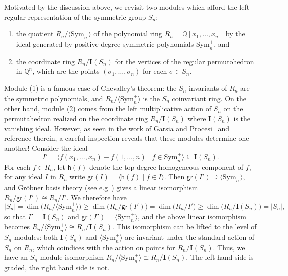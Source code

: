 \documentclass[12pt]{amsart}
\theoremstyle{definition}
\theoremstyle{remark}
\numberwithin{equation}{section}
\newcommand{\QQ}{\mathbb{Q}}
\newcommand{\Sym}{\mathrm{Sym}}
\begin{document}
Motivated by the discussion above, we revisit two modules which afford the left regular representation of the symmetric group $S_{n}$:
\begin{enumerate}[itemsep = 1ex]
\item the quotient $R_{n}\big/\langle \Sym_{n}^{+} \rangle$ of the polynomial ring $R_{n} = \QQ[x_{1}, \ldots, x_{n}]$ by the ideal generated by positive-degree symmetric polynomials $\Sym_{n}^{+}$, and

\item the coordinate ring $R_{n} / \mathbf{I}(S_{n})$ for the vertices of the regular permutohedron in $\QQ^{n}$, which are the points $(\sigma_{1}, \ldots, \sigma_{n})$ for each $\sigma \in S_{n}$.%

\end{enumerate}
Module (1) is a famous case of Chevalley's theorem: the $S_{n}$-invariants of $R_{n}$ are the symmetric polynomials, and $R_{n}\big/\langle \Sym_{n}^{+} \rangle$ is the $S_{n}$ coinvariant ring.  
On the other hand, module (2) comes from the left multiplicative action of $S_{n}$ on the permutahedron realized on the coordinate ring $R_{n} / \mathbf{I}(S_{n})$  where $\mathbf{I}(S_{n})$ is the vanishing ideal. 
However, as seen in the work of Garsia and Procesi~\cite{GP} and reference therein, a careful inspection reveals that these modules determine one another!  
Consider the ideal
\[
I' = \langle f(x_{1}, \ldots, x_{n}) - f(1, \ldots, n) \;|\; f \in \Sym_{n}^{+} \rangle \subseteq \mathbf{I}(S_{n}).
\]
For each $f \in R_{n}$, let $\mathsf{h}(f)$ denote the top-degree homogeneous component of $f$, for any ideal $I$ in $R_{n}$ write $\mathsf{gr}(I) = \langle \mathsf{h}(f) \;|\; f \in I \rangle$.  
Then $\mathsf{gr}(I') \supseteq \langle \Sym_{n}^{+} \rangle$, and Gr\"{o}bner basis theory (see e.g~\cite{CLO}) gives a linear isomorphism $R_{n}\big/\mathsf{gr}(I')  \cong R_{n}\big/I'$.  We therefore have
\[
|S_{n}| = \dim\big(R_{n}\big/\langle \Sym_{n}^{+} \rangle\big) \ge \dim\big(R_{n}\big/\mathsf{gr}(I')\big) = \dim\big(R_{n}\big/I') \ge \dim(R_{n}\big/\mathbf{I}(S_{n})\big) = |S_{n}|,
\]
so that $I' = \mathbf{I}(S_{n})$ and $\mathsf{gr}(I') = \langle \Sym_{n}^{+} \rangle$, and the above linear isomorphism becomes $R_{n}\big/\langle \Sym_{n}^{+} \rangle \cong R_{n}\big/\mathbf{I}(S_{n})$.  
This isomorphism can be lifted to the level of $S_{n}$-modules: both $\mathbf{I}(S_{n})$ and $\langle \Sym_{n}^{+} \rangle$ are invariant under the standard action of $S_{n}$ on $R_{n}$, which coindices with the action on points for $R_{n}\big/\mathbf{I}(S_{n})$.  
Thus, we have an $S_{n}$-module isomorphism $R_{n}\big/\langle \Sym_{n}^{+} \rangle \cong R_{n}\big/\mathbf{I}(S_{n})$.  The left hand side is graded, the right hand side is not.
\end{document}
